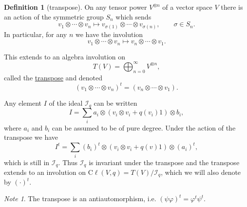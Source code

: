 \documentclass[a4paper]{report}
\newcommand{\defn}[1]{\ul{#1}}
\newcommand{\cliff}{\mathrm{C}\ell}
\theoremstyle{definition}
\newtheorem{definition}{Definition}[section]
\theoremstyle{plain}
\theoremstyle{remark}
\newtheorem{note}{Note}[section]
\begin{document}
\begin{definition}[transpose]
  \label{def:transpose}
  On any tensor power $V^{\otimes n}$ of a vector space $V$ there is an action of the symmetric group $S_{n}$ which sends
  \begin{equation*}
    v_{1} \otimes \cdots \otimes v_{n} \mapsto v_{\sigma(1)} \otimes \cdots \otimes v_{\sigma(n)},\qquad \sigma \in S_{n}.
  \end{equation*}
  In particular, for any $n$ we have the involution
  \begin{equation*}
    v_{1} \otimes \cdots \otimes v_{n} \mapsto v_{n} \otimes \cdots \otimes v_{1}.
  \end{equation*}

  This extends to an algebra involution on
  \begin{equation*}
    T(V) = \bigoplus_{n=0}^{\infty} V^{\otimes n},
  \end{equation*}
  called the \defn{transpose} and denoted
  \begin{equation*}
    (v_{1} \otimes \cdots \otimes v_{n})^{t} = (v_{n} \otimes \cdots \otimes v_{1}).
  \end{equation*}

  Any element $I$ of the ideal $\mathscr{I}_{q}$ can be written
  \begin{equation*}
    I = \sum_{i} a_{i} \otimes\left( v_{i} \otimes v_{i} + q(v_{i})1 \right) \otimes b_{i},
  \end{equation*}
  where $a_{i}$ and $b_{i}$ can be assumed to be of pure degree. Under the action of the transpose we have 
  \begin{equation*}
    I^{t} = \sum_{i} (b_{i})^{t} \otimes \left( v_{i} \otimes v_{i} + q(v)1 \right) \otimes (a_{i})^{t},
  \end{equation*}
  which is still in $\mathscr{I}_{q}$. Thus $\mathscr{I}_{q}$ is invariant under the transpose and the transpose extends to an involution on $\cliff(V,q) = T(V) / \mathscr{I}_{q}$, which we will also denote by $(\cdot)^{t}$.
\end{definition}
\begin{note}
  The transpose is an antiautomorphism, i.e. $(\psi\varphi)^{t} = \varphi^{t}\psi^{t}$.
\end{note}
\end{document}
